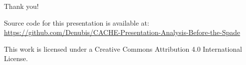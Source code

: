 \documentclass[aspectratio=1610, 11pt]{beamer} %
\begin{document}
  
%   
%   


\begin{frame}{Thank you!}


Source code for this presentation is available at: \url{https://github.com/Denubis/CACHE-Presentation-Analysis-Before-the-Spade}

This work is licensed under a Creative Commons Attribution 4.0 International License.

\end{frame}
\end{document}
